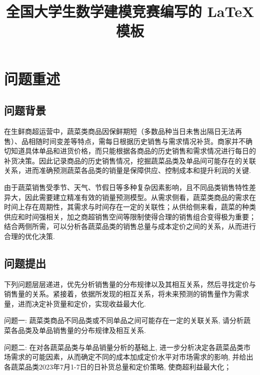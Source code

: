 \documentclass{cumcmthesis}
\title{全国大学生数学建模竞赛编写的 \LaTeX{} 模板}
\begin{document}
 \maketitle
 \begin{abstract}%

\end{abstract}



\section{问题重述}%
\subsection{问题背景}

在生鲜商超运营中，蔬菜类商品因保鲜期短（多数品种当日未售出隔日无法再售）、品相随时间变差等特点，需每日根据历史销售与需求情况补货。商家并不确切知道具体单品和进货价格，而只能根据各商品的历史销售和需求情况进行每日的补货决策。因此记录商品的历史销售情况，挖掘蔬菜品类及单品间可能存在的关联关系，进而准确预测蔬菜各品类的销量是保障供应、控制成本和提升利润的关键. 

由于蔬菜销售受季节、天气、节假日等多种复杂因素影响，且不同品类销售特性差异大，因此需要建立精准有效的销量预测模型。从需求侧看，蔬菜类商品的需求在时间上存在周期性，其需求与时间存在一定的关联性；从供给侧来看，蔬菜的种类供应和时间强相关，加之商超销售空间等限制使得合理的销售组合变得极为重要；结合两侧所需，可以分析各蔬菜品类的销售总量与成本定价之间的关系，从而进行合理的优化决策.

\subsection{问题提出}

下列问题层层递进，优先分析销售量的分布规律以及其相互关系，然后寻找定价与销售量的关系。紧接着，依据所发现的相互关系，将未来预测的销售量作为需求量，进而决定补货量和定价，实现收益最大化.

问题一: 蔬菜类商品不同品类或不同单品之间可能存在一定的关联关系, 请分析蔬菜各品类及单品销售量的分布规律及相互关系.

问题二: 在对各蔬菜品类与单品销量分析的基础上, 进一步分析决定各蔬菜品类市场需求的可能因素，从而确定不同的成本加成定价水平对市场需求的影响, 并给出各蔬菜品类2023年7月1-7日的日补货总量和定价策略, 使商超利益最大化；
\end{document}
